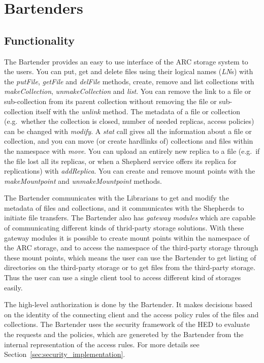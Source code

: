 \documentclass{book}
\begin{document}

\newpage

\section{Bartenders} %
\label{sec:bartenders}

\subsection{Functionality} %

The Bartender provides an easy to use interface of the ARC storage system to the users. You can put, get and delete files using their logical names (\emph{LN}s) with the \emph{putFile}, \emph{getFile} and \emph{delFile} methods, create, remove and list collections with \emph{makeCollection}, \emph{unmakeCollection} and \emph{list}. You can remove the link to a file or sub-collection from its parent collection without removing the file or sub-collection itself with the \emph{unlink} method. The metadata of a file or collection (e.g.~whether the collection is closed, number of needed replicas, access policies) can be changed with \emph{modify}. A \emph{stat} call gives all the information about a file or collection, and you can move (or create hardlinks of) collections and files within the namespace with \emph{move}. You can upload an entirely new replica to a file (e.g.~if the file lost all its replicas, or when a Shepherd service offers its replica for replications) with \emph{addReplica}. You can create and remove mount points with the \emph{makeMountpoint} and \emph{unmakeMountpoint} methods.

The Bartender communicates with the Librarians to get and modify the metadata of files and collections, and it communicates with the Shepherds to initiate file transfers. The Bartender also has \emph{gateway modules} which are capable of communicating different kinds of thrid-party storage solutions. With these gateway modules it is possible to create mount points within the namespace of the ARC storage, and to access the namespace of the third-party storage through these mount points, which means the user can use the Bartender to get listing of directories on the third-party storage or to get files from the third-party storage. Thus the user can use a single client tool to access different kind of storages easily.

The high-level authorization is done by the Bartender. It makes decisions based on the identity of the connecting client and the access policy rules of the files and collections. The Bartender uses the security framework of the HED to evaluate the requests and the policies, which are genereted by the Bartender from the internal representation of the access rules. For more details see Section~\ref{sec:security_implementation}.
\end{document}
